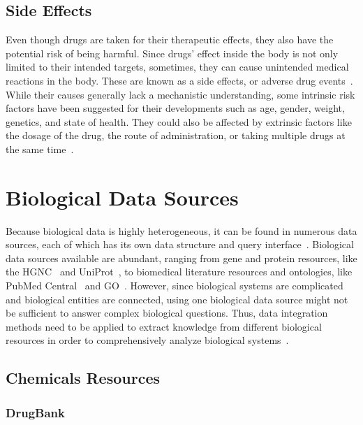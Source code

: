 \subsection{Side Effects}

Even though drugs are taken for their therapeutic effects, they also have the potential risk of being harmful.
Since drugs’ effect inside the body is not only limited to their intended targets, sometimes, they can cause unintended medical reactions in the body.
These are known as a side effects, or adverse drug events~\cite{pourpak_understanding_2008}.
While their causes generally lack a mechanistic understanding, some intrinsic risk factors have been suggested for their developments such as age, gender, weight, genetics, and state of health.
They could also be affected by extrinsic factors like the dosage of the drug, the route of administration, or taking multiple drugs at the same time~\cite{pourpak_understanding_2008}.

\section{Biological Data Sources}

Because biological data is highly heterogeneous, it can be found in numerous data sources, each of which has its own data structure and query interface~\cite{baralis_exploring_2008}.
Biological data sources available are abundant, ranging from gene and protein resources, like the \ac{HGNC}~\cite{baralis_exploring_2008} and UniProt~\cite{noauthor_uniprot:_2019}, to biomedical literature resources and ontologies, like PubMed Central~\cite{roberts_pubmed_2001} and \ac{GO}~\cite{noauthor_gene_2008}.
However, since biological systems are complicated and biological entities are connected, using one biological data source might not be sufficient to answer complex biological questions.
Thus, data integration methods need to be applied to extract knowledge from different biological resources in order to comprehensively analyze biological systems~\cite{baralis_exploring_2008}.

\subsection{Chemicals Resources}

\subsubsection{DrugBank}

